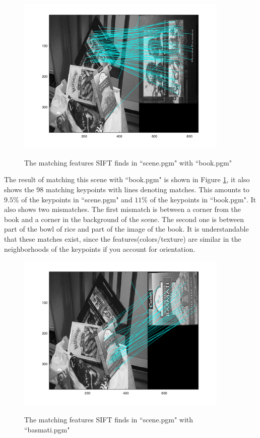 \documentclass[11pt,a4paper]{article}
\begin{document}
\begin{figure}
\centering
    \includegraphics[width=0.9\textwidth]{./img/scene-book-match.png} \\
\caption{The matching features SIFT finds in ``scene.pgm" with ``book.pgm"}
\label{fig:scenebookmatch}
\end{figure}

The result of matching this scene with ``book.pgm" is shown in Figure \ref{fig:scenebookmatch}, it also shows the 98 matching keypoints with lines denoting matches.
This amounts to $9.5\%$ of the keypoints in ``scene.pgm" and $11\%$ of the keypoints in ``book.pgm".
It also shows two mismatches.
The first mismatch is between a corner from the book and a corner in the background of the scene.
The second one is between part of the bowl of rice and part of the image of the book.
It is understandable that these matches exist, since the features(colors/texture) are similar in the neighborhoods of the keypoints if you account for orientation.

\begin{figure}
\centering
    \includegraphics[width=0.9\textwidth]{./img/scene-basmati-match.png} \\
\caption{The matching features SIFT finds in ``scene.pgm" with ``basmati.pgm"}
\label{fig:scenebasmatimatch}
\end{figure}
\end{document}
